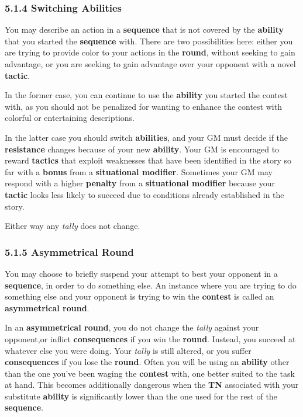 \documentclass[
  11pt,
]{article}
\begin{document}
\hypertarget{switching-abilities}{%
\subsubsection{5.1.4 Switching Abilities}\label{switching-abilities}}

You may describe an action in a \textbf{sequence} that is not covered by
the \textbf{ability} that you started the \textbf{sequence} with. There
are two possibilities here: either you are trying to provide color to
your actions in the \textbf{round}, without seeking to gain advantage,
or you are seeking to gain advantage over your opponent with a novel
\textbf{tactic}.

In the former case, you can continue to use the \textbf{ability} you
started the contest with, as you should not be penalized for wanting to
enhance the contest with colorful or entertaining descriptions.

In the latter case you should switch \textbf{abilities}, and your GM
must decide if the \textbf{resistance} changes because of your new
\textbf{ability}. Your GM is encouraged to reward \textbf{tactics} that
exploit weaknesses that have been identified in the story so far with a
\textbf{bonus} from a \textbf{situational modifier}. Sometimes your GM
may respond with a higher \textbf{penalty} from a \textbf{situational
modifier} because your \textbf{tactic} looks less likely to succeed due
to conditions already established in the story.

Either way any \emph{tally} does not change.

\hypertarget{asymmetrical-round}{%
\subsubsection{5.1.5 Asymmetrical Round}\label{asymmetrical-round}}

You may choose to briefly suspend your attempt to best your opponent in
a \textbf{sequence}, in order to do something else. An instance where
you are trying to do something else and your opponent is trying to win
the \textbf{contest} is called an \textbf{asymmetrical round}.

In an \textbf{asymmetrical round}, you do not change the \emph{tally}
against your opponent,or inflict \textbf{consequences} if you win the
\textbf{round}. Instead, you succeed at whatever else you were doing.
Your \emph{tally} is still altered, or you suffer \textbf{consequences}
if you lose the \textbf{round}. Often you will be using an
\textbf{ability} other than the one you've been waging the
\textbf{contest} with, one better suited to the task at hand. This
becomes additionally dangerous when the \textbf{TN} associated with your
substitute \textbf{ability} is significantly lower than the one used for
the rest of the \textbf{sequence}.
\end{document}
